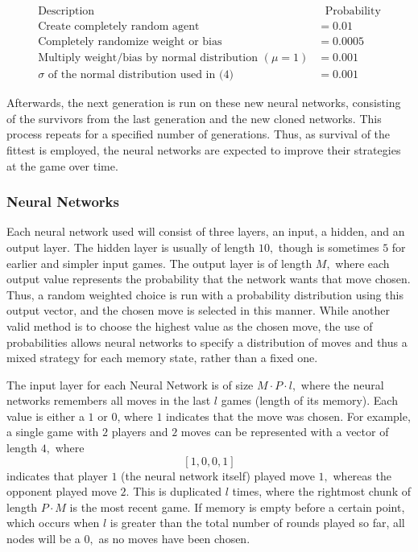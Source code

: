\documentclass{article}
\begin{document}
\begin{align}
\text{Description} &\ \ \ \text{Probability}\\
\text{Create completely random agent} &= 0.01\\
\text{Completely randomize weight or bias} &= 0.0005\\
\text{Multiply weight/bias by normal distribution } (\mu=1) &= 0.001\\
\sigma\text{ of the normal distribution used in (4)} &= 0.001
\end{align}

Afterwards, the next generation is run on these new neural networks, consisting of the survivors from the last generation and the new cloned networks. This process repeats for a specified number of generations. Thus, as survival of the fittest is employed, the neural networks are expected to improve their strategies at the game over time.

\subsubsection{Neural Networks}
\label{subsubsection:NNs}

Each neural network used will consist of three layers, an input, a hidden, and an output layer. The hidden layer is usually of length $10,$ though is sometimes $5$ for earlier and simpler input games. The output layer is of length $M,$ where each output value represents the probability that the network wants that move chosen. Thus, a random weighted choice is run with a probability distribution using this output vector, and the chosen move is selected in this manner. While another valid method is to choose the highest value as the chosen move, the use of probabilities allows neural networks to specify a distribution of moves and thus a mixed strategy for each memory state, rather than a fixed one.

The input layer for each Neural Network is of size $M\cdot P \cdot l,$ where the neural networks remembers all moves in the last $l$ games (length of its memory). Each value is either a $1$ or $0$, where $1$ indicates that the move was chosen. For example, a single game with $2$ players and $2$ moves can be represented with a vector of length $4,$ where $$[1,0,0,1]$$ indicates that player $1$ (the neural network itself) played move $1,$ whereas the opponent played move $2.$ This is duplicated $l$ times, where the rightmost chunk of length $P\cdot M$ is the most recent game. If memory is empty before a certain point, which occurs when $l$ is greater than the total number of rounds played so far, all nodes will be a $0,$ as no moves have been chosen.
\end{document}
